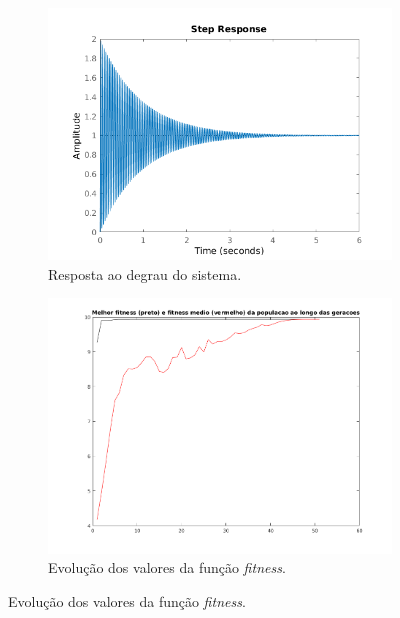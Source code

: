 \begin {enumerate}
\begin{figure}[h!]
		\begin{subfigure}{.5\textwidth}
		  \centering
		  \includegraphics[width=1\linewidth]{image/step_pid_ex_c_mod}
		  \caption{Resposta ao degrau do sistema.}
		  \label{fig:pid_step_c_mod}
		\end{subfigure}%
		\begin{subfigure}{.5\textwidth}
		  \centering
		  \includegraphics[width=1\linewidth]{image/melhor_fitness_pid_ex_c_mod}
		  \caption{Evolução dos valores da função \textit{fitness}.}
		  \label{fig:pid_fitness_c_mod}
		\end{subfigure}%
		

\end{figure}
\end{enumerate}
